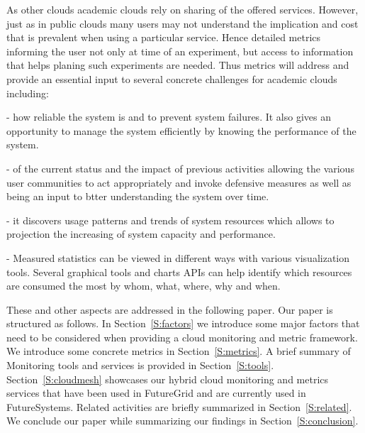 \documentclass{sig-alternate-05-2015}
\begin{document}
As other clouds academic clouds rely on sharing of the offered services. However, just as in public clouds many users may not understand the implication and cost that is prevalent when using a particular service. Hence detailed metrics informing the user not only at time of an experiment, but access to information that helps planing such experiments are needed. Thus metrics will address and provide an essential input to several concrete challenges for academic clouds including:

\begin{description}
\setlength\itemsep{-2pt}

\item[\it Understanding] - how reliable the system is and to prevent system failures. It also gives an opportunity to manage the system efficiently by knowing the performance of the system.

\item[\it Getting informed] - of the current status and the impact of previous activities allowing the various user communities to act
  appropriately and invoke defensive measures as well as being an  input to btter understanding the system over time.

\item[\it Estimating future requests] - it discovers usage patterns and trends of system resources which allows to projection the increasing of system capacity and performance.

\item[\it Reporting] - Measured statistics can be viewed in different ways with various visualization tools. Several graphical tools and charts APIs can help identify which resources are consumed the most by whom, what, where, why and when.

\end{description}

These and other aspects are addressed in the following paper. Our paper is structured as follows. In Section~\ref{S:factors} we introduce some major factors that need to be considered when providing a cloud monitoring and metric framework. We introduce some concrete metrics in Section~\ref{S:metrics}.  A brief summary of Monitoring tools and services is provided in Section~\ref{S:tools}.  Section~\ref{S:cloudmesh} showcases our hybrid cloud monitoring and metrics services that have been used in FutureGrid and are currently used in FutureSystems. Related activities are briefly summarized in Section~\ref{S:related}.  We conclude our paper while summarizing our findings in Section~\ref{S:conclusion}.
\end{document}
